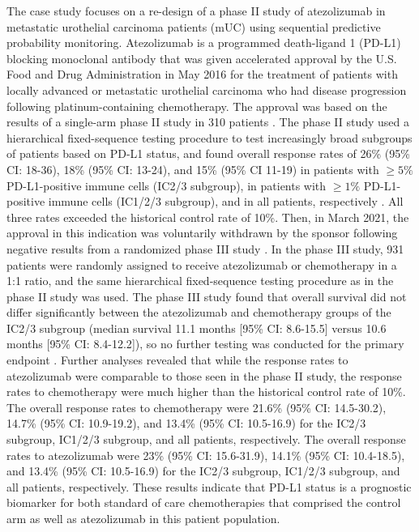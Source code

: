 The case study focuses on a re-design of a phase II study of
atezolizumab in metastatic urothelial carcinoma patients (mUC) using
sequential predictive probability monitoring. Atezolizumab is a
programmed death-ligand 1 (PD-L1) blocking monoclonal antibody that was
given accelerated approval by the U.S. Food and Drug Administration in
May 2016 for the treatment of patients with locally advanced or
metastatic urothelial carcinoma who had disease progression following
platinum-containing chemotherapy. The approval was based on the results
of a single-arm phase II study in 310 patients \citep{Rosenberg2016}.
The phase II study used a hierarchical fixed-sequence testing procedure
to test increasingly broad subgroups of patients based on PD-L1 status,
and found overall response rates of 26\% (95\% CI: 18-36), 18\% (95\%
CI: 13-24), and 15\% (95\% CI 11-19) in patients with \(\geq5\%\)
PD-L1-positive immune cells (IC2/3 subgroup), in patients with
\(\geq1\%\) PD-L1-positive immune cells (IC1/2/3 subgroup), and in all
patients, respectively \citep{Rosenberg2016}. All three rates exceeded
the historical control rate of 10\%. Then, in March 2021, the approval
in this indication was voluntarily withdrawn by the sponsor following
negative results from a randomized phase III study \citep{Powles2018}.
In the phase III study, 931 patients were randomly assigned to receive
atezolizumab or chemotherapy in a 1:1 ratio, and the same hierarchical
fixed-sequence testing procedure as in the phase II study was used. The
phase III study found that overall survival did not differ significantly
between the atezolizumab and chemotherapy groups of the IC2/3 subgroup
(median survival 11.1 months {[}95\% CI: 8.6-15.5{]} versus 10.6 months
{[}95\% CI: 8.4-12.2{]}), so no further testing was conducted for the
primary endpoint \citep{Powles2018}. Further analyses revealed that
while the response rates to atezolizumab were comparable to those seen
in the phase II study, the response rates to chemotherapy were much
higher than the historical control rate of 10\%. The overall response
rates to chemotherapy were 21.6\% (95\% CI: 14.5-30.2), 14.7\% (95\% CI:
10.9-19.2), and 13.4\% (95\% CI: 10.5-16.9) for the IC2/3 subgroup,
IC1/2/3 subgroup, and all patients, respectively. The overall response
rates to atezolizumab were 23\% (95\% CI: 15.6-31.9), 14.1\% (95\% CI:
10.4-18.5), and 13.4\% (95\% CI: 10.5-16.9) for the IC2/3 subgroup,
IC1/2/3 subgroup, and all patients, respectively. These results indicate
that PD-L1 status is a prognostic biomarker for both standard of care
chemotherapies that comprised the control arm as well as atezolizumab in
this patient population.

